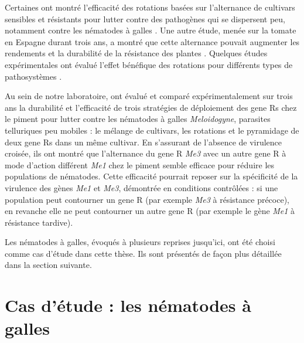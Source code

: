 	 Certaines ont montré l’efficacité des rotations basées sur l'alternance de cultivars sensibles et résistants  pour lutter contre des pathogènes qui se dispersent peu, notamment contre les nématodes à galles \citep{McSorley2011, Miller2006, Tzortzakakis2000}. Une autre étude, menée sur la tomate en Espagne durant trois ans, a montré que cette alternance pouvait augmenter les rendements et la durabilité de la résistance des plantes  \citep{Talavera2009}. Quelques  études expérimentales ont évalué l'effet bénéfique des rotations pour différents types de pathosystèmes \citep{Zhu2000, Talavera2009, Djian-Caporalino2014, Burdon2014}. 

	 Au sein de notre laboratoire,  \citet{Djian-Caporalino2014} ont évalué et comparé expérimentalement sur trois ans  la  durabilité et l'efficacité de trois stratégies de déploiement des \glspl{gene R} chez le piment pour lutter contre les  nématodes à  galles \textit{Meloidogyne},  parasites telluriques peu mobiles :
le mélange de cultivars, les rotations  et le pyramidage de deux \glspl{gene R} dans un même cultivar. 
En s'assurant de l'absence  de virulence croisée, ils ont montré que l'alternance du \gls{gene R}  \textit{Me3} avec un autre \gls{gene R} à  mode d'action différent  \textit{Me1} chez le piment semble efficace pour réduire les populations de nématodes. Cette  efficacité pourrait reposer sur la spécificité de la virulence des gènes \textit{Me1 } et \textit{Me3},  démontrée en conditions contrôlées \citep{Djian-Caporalino2011} :  si une population peut contourner un \gls{gene R} (par exemple \textit{Me3} à résistance précoce), en revanche elle ne peut contourner un autre \gls{gene R} (par exemple le gène \textit{Me1} à résistance tardive).


	
	Les nématodes à galles, évoqués à plusieurs reprises jusqu'ici, ont été choisi comme cas d'étude  dans cette thèse. Ils sont présentés  de façon plus détaillée dans la section suivante.


\section{Cas d'étude : les nématodes à galles } \label{nematode}

